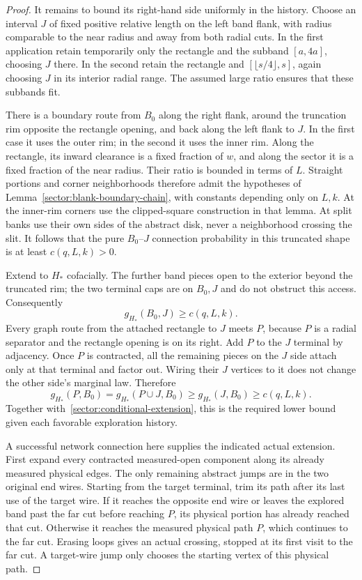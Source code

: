 \begin{proof}
It remains to bound its right-hand side uniformly in the history.
Choose an interval $J$ of fixed positive relative length on the
left band flank, with radius comparable to the near radius and away
from both radial cuts.  In the first application retain temporarily
only the rectangle and the subband $[a,4a]$, choosing $J$ there.  In
the second retain the rectangle and
$[\lfloor s/4\rfloor,s]$, again choosing $J$ in its interior radial
range.  The assumed large ratio ensures that these subbands fit.

There is a boundary route from $B_0$ along the right flank, around
the truncation rim opposite the rectangle opening, and back along
the left flank to $J$.  In the first case it uses the outer rim; in
the second it uses the inner rim.  Along the rectangle, its inward
clearance is a fixed fraction of $w$, and along the sector it is a
fixed fraction of the near radius.  Their ratio is bounded in terms
of $L$.  Straight portions and corner neighborhoods therefore admit
the hypotheses of Lemma~\ref{sector:blank-boundary-chain}, with
constants depending only on $L,k$.  At the inner-rim corners use
the clipped-square construction in that lemma.  At split banks use
their own sides of the abstract disk, never a neighborhood crossing
the slit.  It follows that the pure $B_0$--$J$ connection probability
in this truncated shape is at least $c(q,L,k)>0$.

Extend to $H_*$ cofacially.  The further band pieces open to the
exterior beyond the truncated rim; the two terminal caps are on
$B_0,J$ and do not obstruct this access.  Consequently
\[
 g_{H_*}(B_0,J)\ge c(q,L,k).
\]
Every graph route from the attached rectangle to $J$ meets $P$,
because $P$ is a radial separator and the rectangle opening is on
its right.  Add $P$ to the $J$ terminal by adjacency.  Once $P$ is
contracted, all the remaining pieces on the $J$ side attach only at
that terminal and factor out.  Wiring their $J$ vertices to it
does not change the other side's marginal law.  Therefore
\[
 g_{H_*}(P,B_0)
   =g_{H_*}(P\cup J,B_0)
   \ge g_{H_*}(J,B_0)\ge c(q,L,k).
\]
Together with~\eqref{sector:conditional-extension}, this is the
required lower bound given each favorable exploration history.

A successful network connection here supplies the indicated actual
extension.  First expand every contracted measured-open component
along its already measured physical edges.  The only remaining
abstract jumps are in the two original end wires.  Starting from the
target terminal, trim its path after its last use of the target wire.
If it reaches the opposite end wire or leaves the explored band past
the far cut before reaching $P$, its physical portion has already
reached that cut.  Otherwise
it reaches the measured physical path $P$, which continues to the
far cut.  Erasing loops gives an actual crossing, stopped at its
first visit to the far cut.  A target-wire jump only chooses the
starting vertex of this physical path.


\end{proof}
